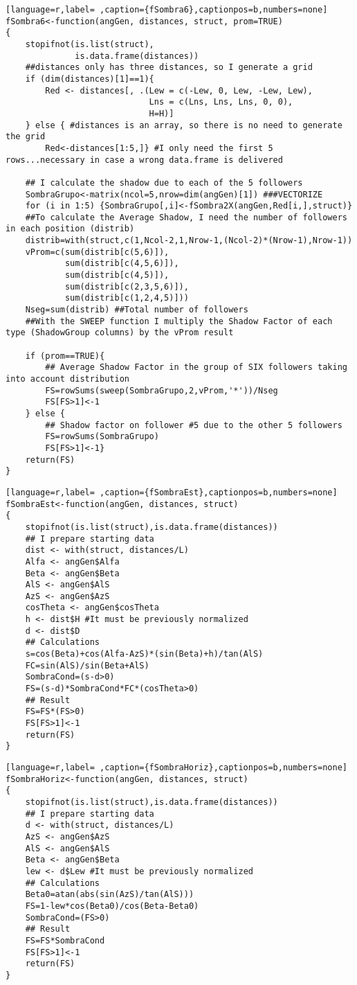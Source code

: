 \begin{lstlisting}[language=r,label= ,caption={fSombra6},captionpos=b,numbers=none]
fSombra6<-function(angGen, distances, struct, prom=TRUE)
{
    stopifnot(is.list(struct),
              is.data.frame(distances))
    ##distances only has three distances, so I generate a grid
    if (dim(distances)[1]==1){ 
        Red <- distances[, .(Lew = c(-Lew, 0, Lew, -Lew, Lew),
                             Lns = c(Lns, Lns, Lns, 0, 0),
                             H=H)]
    } else { #distances is an array, so there is no need to generate the grid
        Red<-distances[1:5,]} #I only need the first 5 rows...necessary in case a wrong data.frame is delivered

    ## I calculate the shadow due to each of the 5 followers
    SombraGrupo<-matrix(ncol=5,nrow=dim(angGen)[1]) ###VECTORIZE
    for (i in 1:5) {SombraGrupo[,i]<-fSombra2X(angGen,Red[i,],struct)}
    ##To calculate the Average Shadow, I need the number of followers in each position (distrib)
    distrib=with(struct,c(1,Ncol-2,1,Nrow-1,(Ncol-2)*(Nrow-1),Nrow-1)) 
    vProm=c(sum(distrib[c(5,6)]),
            sum(distrib[c(4,5,6)]),
            sum(distrib[c(4,5)]),
            sum(distrib[c(2,3,5,6)]),
            sum(distrib[c(1,2,4,5)]))
    Nseg=sum(distrib) ##Total number of followers
    ##With the SWEEP function I multiply the Shadow Factor of each type (ShadowGroup columns) by the vProm result

    if (prom==TRUE){
        ## Average Shadow Factor in the group of SIX followers taking into account distribution
        FS=rowSums(sweep(SombraGrupo,2,vProm,'*'))/Nseg
        FS[FS>1]<-1
    } else {		
        ## Shadow factor on follower #5 due to the other 5 followers
        FS=rowSums(SombraGrupo)
        FS[FS>1]<-1}
    return(FS)
}
\end{lstlisting}
\begin{lstlisting}[language=r,label= ,caption={fSombraEst},captionpos=b,numbers=none]
fSombraEst<-function(angGen, distances, struct)
{
    stopifnot(is.list(struct),is.data.frame(distances))
    ## I prepare starting data
    dist <- with(struct, distances/L)
    Alfa <- angGen$Alfa
    Beta <- angGen$Beta
    AlS <- angGen$AlS
    AzS <- angGen$AzS
    cosTheta <- angGen$cosTheta
    h <- dist$H #It must be previously normalized
    d <- dist$D                   
    ## Calculations
    s=cos(Beta)+cos(Alfa-AzS)*(sin(Beta)+h)/tan(AlS)
    FC=sin(AlS)/sin(Beta+AlS)
    SombraCond=(s-d>0)
    FS=(s-d)*SombraCond*FC*(cosTheta>0)
    ## Result
    FS=FS*(FS>0)
    FS[FS>1]<-1
    return(FS)
}
\end{lstlisting}
\begin{lstlisting}[language=r,label= ,caption={fSombraHoriz},captionpos=b,numbers=none]
fSombraHoriz<-function(angGen, distances, struct)
{
    stopifnot(is.list(struct),is.data.frame(distances))
    ## I prepare starting data 	
    d <- with(struct, distances/L)
    AzS <- angGen$AzS
    AlS <- angGen$AlS
    Beta <- angGen$Beta
    lew <- d$Lew #It must be previously normalized
    ## Calculations
    Beta0=atan(abs(sin(AzS)/tan(AlS)))
    FS=1-lew*cos(Beta0)/cos(Beta-Beta0)
    SombraCond=(FS>0)
    ## Result
    FS=FS*SombraCond
    FS[FS>1]<-1
    return(FS)
}
\end{lstlisting}
